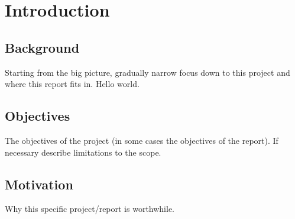 \chapter{Introduction}

\section{Background}

Starting from the big picture, gradually narrow focus down to this project and where this report fits in. Hello world.

\section{Objectives}

The objectives of the project (in some cases the objectives of the report). If necessary describe limitations to the scope.

\section{Motivation}

Why this specific project/report is worthwhile.